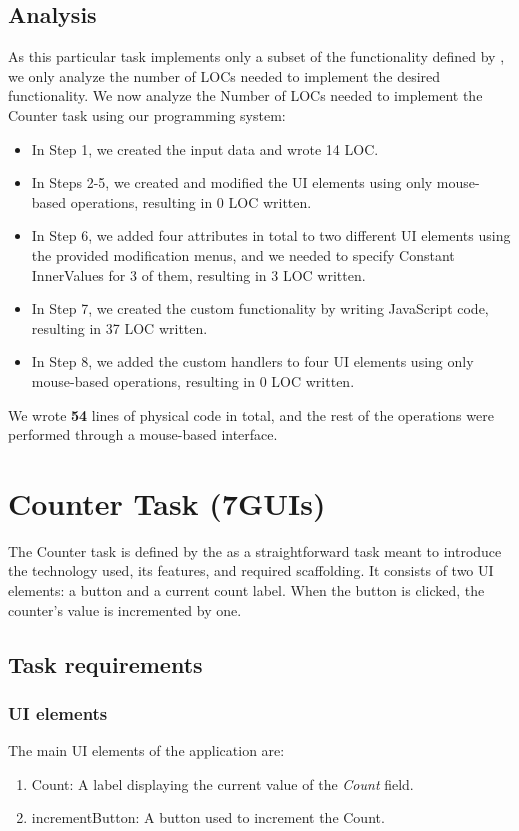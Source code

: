 \medskip
\subsection{Analysis}
As this particular task implements only a subset of the functionality defined by \citet{todo-spec}, we only analyze the number of LOCs needed to implement the desired functionality.
We now analyze the Number of LOCs needed to implement the Counter task using our programming system:
\begin{itemize}
	\item In Step 1, we created the input data and wrote 14 LOC.
	\item   In Steps 2-5, we created and modified the UI elements using only mouse-based operations, resulting in 0 LOC written.
	\item   In Step 6, we added four attributes in total to two different UI elements using the provided modification menus, and we needed to specify Constant InnerValues for 3 of them, resulting in 3 LOC written.
	\item   In Step 7, we created the custom functionality by writing JavaScript code, resulting in 37 LOC written.
	\item In Step 8, we added the custom handlers to four UI elements using only mouse-based operations, resulting in 0 LOC written.
\end{itemize}
\noindent We wrote \textbf{54} lines of physical code in total, and the rest of the operations were performed through a mouse-based interface.



\clearpage
\section{Counter Task (7GUIs)}
The Counter task is defined by the \citet{7GUIs-web} as a straightforward task meant to introduce the technology used, its features, and required scaffolding.
It consists of two UI elements: a button and a current count label. When the button is clicked, the counter's value is incremented by one.

\subsection{Task requirements}
\subsubsection{UI elements}
The main UI elements of the application are:
\begin{enumerate}
	\item Count: A label displaying the current value of the \emph{Count} field.
	\item incrementButton: A button used to increment the Count.
\end{enumerate}

